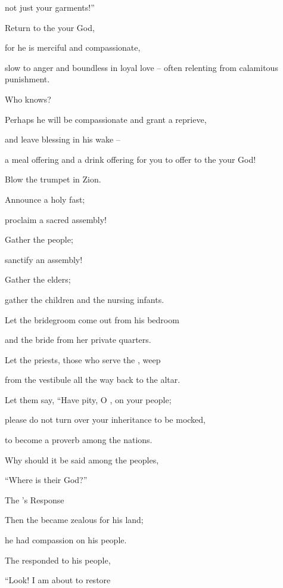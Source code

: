 {\par }{\Q not just your garments!”
\par }{\Q {}Return
to
the {}
your God,
\par }{\Q for
he is merciful
and compassionate,
\par }{\Q slow
to anger
and boundless
in loyal love –
often relenting
from
calamitous punishment.
\par }{\Q {}Who
knows?
\par }{\Q Perhaps
he will be
compassionate
and grant a reprieve,
\par }{\Q and leave blessing in his wake –
\par }{\Q a meal offering and a drink offering for you to offer to the
{} your God!
\par }{\Q {}Blow
the trumpet
in Zion.
\par }{\Q Announce a holy
fast;
\par }{\Q proclaim
a sacred assembly!
\par }{\Q {}Gather
the people;
\par }{\Q sanctify
an assembly!
\par }{\Q Gather
the elders;
\par }{\Q gather
the children
and the nursing infants.
\par }{\Q Let the bridegroom
come out
from his bedroom
\par }{\Q and the bride
from her private quarters.
\par }{\Q {}Let the priests,
those who serve
the {}, weep
\par }{\Q from the vestibule
all the way back to the altar.
\par }{\Q Let them say,
“Have pity,
O
{}, on
your people;
\par }{\Q please do not
turn
over your inheritance
to be mocked,
\par }{\Q to become a proverb
among the nations.
\par }{\Q Why
should it be said
among the peoples,
\par }{\Q “Where
is their God?”
\par }{\SH The
{}’s Response
\par }{\Q {}Then the
{}
became zealous
for his land;
\par }{\Q he had compassion
on
his people.
\par }{\Q {}The
{}
responded
to his people,
\par }{\Q “Look! I am about to restore
}
